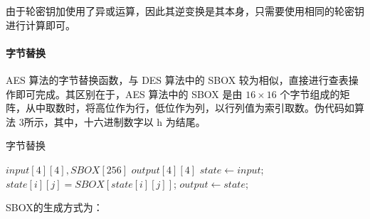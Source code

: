 \documentclass[a4paper, zihao=-4, UTF-8]{ctexart}
\begin{document}
	由于轮密钥加使用了异或运算，因此其逆变换是其本身，只需要使用相同的轮密钥进行计算即可。
	
	\paragraph{字节替换} AES 算法的字节替换函数，与 DES 算法中的 SBOX 较为相似，直接进行查表操作即可完成。其区别在于，AES 算法中的 SBOX 是由 $16\times16$ 个字节组成的矩阵，从中取数时，将高位作为行，低位作为列，以行列值为索引取数。伪代码如算法 3所示，其中，十六进制数字以 h 为结尾。
	
	\begin{algorithm}[htbp]
		\caption{字节替换}
		\label{alg:subbytes}
		\begin{algorithmic}[1]
			\Require $input[4][4], SBOX[256]$
			\Ensure $output[4][4]$
			\State $state\gets input$;
					\State $state[i][j]=SBOX[state[i][j]]$;
				\EndFor
			\EndFor
			\State $output\gets state$;
			\State {}
			\EndFunction
		\end{algorithmic}
	\end{algorithm}
	
	SBOX的生成方式为：
	
\end{document}
